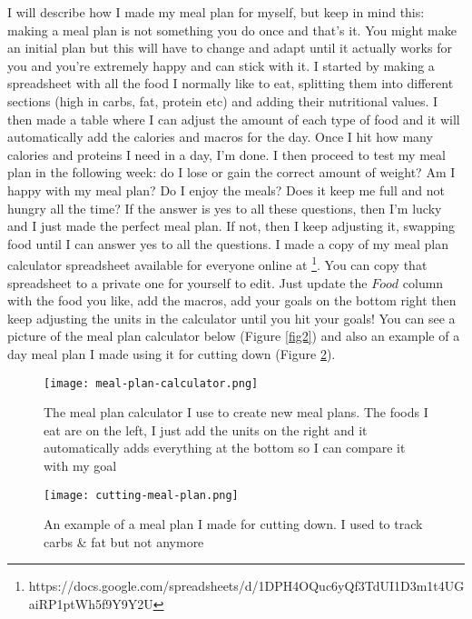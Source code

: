 \documentclass[openany, 12pt]{book}
\begin{document}
        I will describe how I made my meal plan for myself, but keep in mind this: making a meal plan is not something you do once and that's it. You might make an initial plan
        but this will have to change and adapt until it actually works for you and you're extremely happy and can stick with it. I started by making a spreadsheet with all the
        food I normally like to eat, splitting them into different sections (high in carbs, fat, protein etc) and adding their nutritional values. I then made a table where
        I can adjust the amount of each type of food and it will automatically add the calories and macros for the day. Once I hit how many calories and proteins I need in a day, 
        I'm done. I then proceed to test my meal plan in the following week: do I lose or gain the correct amount of weight? Am I happy with my meal plan? Do I enjoy the meals?
        Does it keep me full and not hungry all the time? If the answer is yes to all these questions, then I'm lucky and I just made the perfect meal plan. If not, then I 
        keep adjusting it, swapping food until I can answer yes to all the questions.
        I made a copy of my meal plan calculator spreadsheet available for everyone online at
        \footnote{https://docs.google.com/spreadsheets/d/1DPH4OQuc6yQf3TdUI1D3m1t4UGaiRP1ptWh5f9Y9Y2U}.
        You can copy that spreadsheet to a private one for yourself to edit. Just update the $Food$ column with the food you like, add the macros, add your goals on the
        bottom right then keep adjusting the units in the calculator until you hit your goals! You can see a picture of the meal plan calculator below (Figure \ref{fig2}) and 
        also an example of a day meal plan I made using it for cutting down (Figure \ref{fig4}).

	\begin{figure}[h]
		\centering
		\texttt{[image: meal-plan-calculator.png]}
		\caption{The meal plan calculator I use to create new meal plans. The foods I eat are on the left, I just add the units on the right and it automatically adds everything at the bottom so I can compare it with my goal}
		\label{fig3}
	\end{figure}
        
	\begin{figure}[h]
		\centering
		\texttt{[image: cutting-meal-plan.png]}
		\caption{An example of a meal plan I made for cutting down. I used to track carbs \& fat but not anymore}
		\label{fig4}
	\end{figure}
\end{document}

